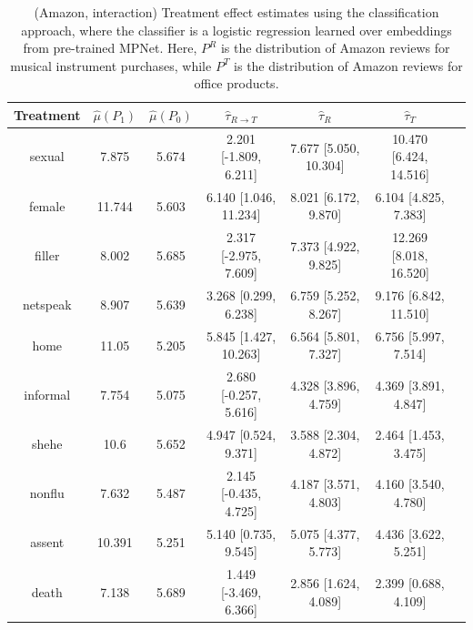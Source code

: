 \documentclass{article}
\begin{document}
\begin{table}[!ht]
    \centering
    \begin{tabular}{c|cccccc}
\toprule
    Treatment   &   $\hat{\mu}(P_1)$ &   $\hat{\mu}(P_0)$ & $\hat{\tau}_{R \rightarrow T}$   & $\hat{\tau}_R$        & $\hat{\tau}_T$         \\
\midrule
    sexual      &              7.875 &              5.674 & 2.201 [-1.809, 6.211]            & 7.677 [5.050, 10.304] & 10.470 [6.424, 14.516] \\
    female      &             11.744 &              5.603 & 6.140 [1.046, 11.234]            & 8.021 [6.172, 9.870]  & 6.104 [4.825, 7.383]   \\
    filler      &              8.002 &              5.685 & 2.317 [-2.975, 7.609]            & 7.373 [4.922, 9.825]  & 12.269 [8.018, 16.520] \\
    netspeak    &              8.907 &              5.639 & 3.268 [0.299, 6.238]             & 6.759 [5.252, 8.267]  & 9.176 [6.842, 11.510]  \\
    home        &             11.05  &              5.205 & 5.845 [1.427, 10.263]            & 6.564 [5.801, 7.327]  & 6.756 [5.997, 7.514]   \\
    informal    &              7.754 &              5.075 & 2.680 [-0.257, 5.616]            & 4.328 [3.896, 4.759]  & 4.369 [3.891, 4.847]   \\
    shehe       &             10.6   &              5.652 & 4.947 [0.524, 9.371]             & 3.588 [2.304, 4.872]  & 2.464 [1.453, 3.475]   \\
    nonflu      &              7.632 &              5.487 & 2.145 [-0.435, 4.725]            & 4.187 [3.571, 4.803]  & 4.160 [3.540, 4.780]   \\
    assent      &             10.391 &              5.251 & 5.140 [0.735, 9.545]             & 5.075 [4.377, 5.773]  & 4.436 [3.622, 5.251]   \\
    death       &              7.138 &              5.689 & 1.449 [-3.469, 6.366]            & 2.856 [1.624, 4.089]  & 2.399 [0.688, 4.109]   \\
\bottomrule
    \end{tabular}
    \caption{(Amazon, interaction) Treatment effect estimates using the classification approach, where the classifier is a logistic regression learned over embeddings from pre-trained MPNet. Here, $P^R$ is the distribution of Amazon reviews for musical instrument purchases, while $P^T$ is the distribution of Amazon reviews for office products.}
    \label{tab:results_clf_mpnet_amazon_synthetic_interaction}
\end{table}
\end{document}
